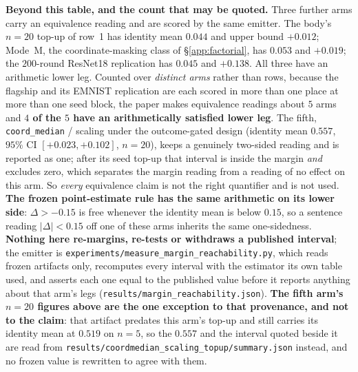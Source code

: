 \documentclass{article}
\begin{document}
\noindent \textbf{Beyond this table, and the count that may be quoted.} Three further arms carry an
equivalence reading and are scored by the same emitter. The body's $n{=}20$ top-up of row~1 has identity
mean $0.044$ and upper bound $+0.012$; Mode~M, the coordinate-masking class of §\ref{app:factorial}, has
$0.053$ and $+0.019$; the $200$-round ResNet18 replication has $0.045$ and $+0.138$. All three have an
arithmetic lower leg. Counted over \emph{distinct arms} rather than rows, because the flagship and its
EMNIST replication are each scored in more than one place at more than one seed block, the paper makes
equivalence readings about $5$ arms and \textbf{$4$ of the $5$ have an arithmetically satisfied lower
leg}. The fifth, \texttt{coord\_median} / scaling under the outcome-gated design (identity mean $0.557$,
$95\%$ CI $[+0.023,+0.102]$, $n{=}20$), keeps a genuinely two-sided reading and is reported as one;
after its seed top-up that interval is inside the margin \emph{and} excludes zero, which separates the
margin reading from a reading of no effect on this arm. So
\emph{every} equivalence claim is not the right quantifier and is not used. \textbf{The frozen
point-estimate rule has the same arithmetic on its lower side}: $\Delta > -0.15$ is free whenever the
identity mean is below $0.15$, so a sentence reading $|\Delta| < 0.15$ off one of these arms inherits the
same one-sidedness. \textbf{Nothing here re-margins, re-tests or withdraws a published interval}; the
emitter is \texttt{experiments/\allowbreak measure\_\allowbreak margin\_\allowbreak reachability.py},
which reads frozen artifacts only, recomputes every interval with the estimator its own table used, and
asserts each one equal to the published value before it reports anything about that arm's legs
(\texttt{results/\allowbreak margin\_\allowbreak reachability.json}).
\textbf{The fifth arm's $n{=}20$ figures above are the one exception to that provenance, and not to the
claim}: that artifact predates this arm's top-up and still carries its identity mean at $0.519$ on
$n{=}5$, so the $0.557$ and the interval quoted beside it are read from
\texttt{results/\allowbreak coordmedian\_\allowbreak scaling\_\allowbreak topup/\allowbreak summary.json}
instead, and no frozen value is rewritten to agree with them.
\end{document}
